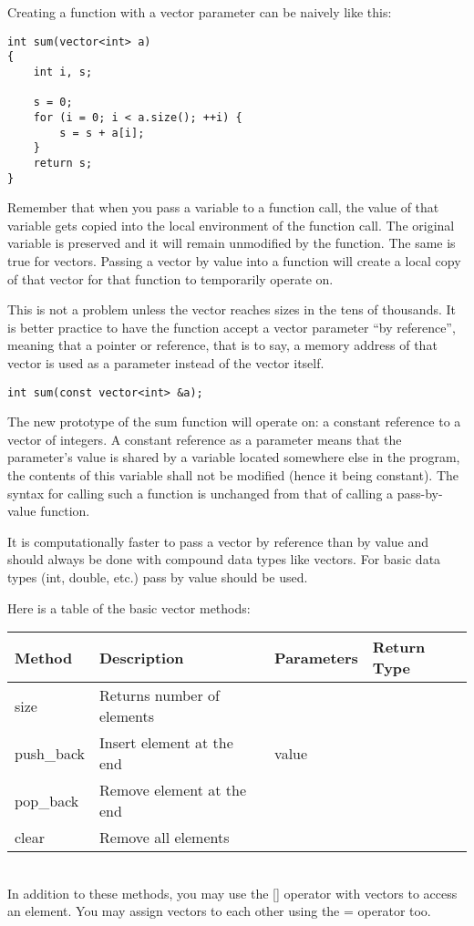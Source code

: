 \documentclass[a4paper,12pt]{article}
\begin{document}
Creating a function with a vector parameter can be naively like this:
\begin{lstlisting}
int sum(vector<int> a)
{
	int i, s;

	s = 0;
	for (i = 0; i < a.size(); ++i) {
		s = s + a[i];
	}
	return s;
}
\end{lstlisting}

Remember that when you pass a variable to a function call, the value of that variable gets copied into the local environment of the function call. The original variable is preserved and it will remain unmodified by the function. The same is true for vectors. Passing a vector by value into a function will create a local copy of that vector for that function to temporarily operate on. 

This is not a problem unless the vector reaches sizes in the tens of thousands. It is better practice to have the function accept a vector parameter ``by reference'', meaning that a pointer or reference, that is to say, a memory address of that vector is used as a parameter instead of the vector itself. 

\begin{lstlisting}
int sum(const vector<int> &a);
\end{lstlisting}

The new prototype of the sum function will operate on: a constant reference to a vector of integers. A constant reference as a parameter means that the parameter's value is shared by a variable located somewhere else in the program, the contents of this variable shall not be modified (hence it being constant). The syntax for calling such a function is unchanged from that of calling a pass-by-value function.

It is computationally faster to pass a vector by reference than by value and should always be done with compound data types like vectors. For basic data types (int, double, etc.) pass by value should be used.

Here is a table of the basic vector methods: \\

\begin{tabular}{|l|l|l|l|}
\hline
Method & Description & Parameters & Return Type \\
\hline
size & Returns number of elements &  &  \\
\hline
push\_back & Insert element at the end & value &  \\
\hline
pop\_back & Remove element at the end &  &  \\
\hline
clear & Remove all elements &  &  \\
\hline
\end{tabular} \\

In addition to these methods, you may use the [] operator with vectors to access an element. You may assign vectors to each other using the = operator too.
\end{document}
